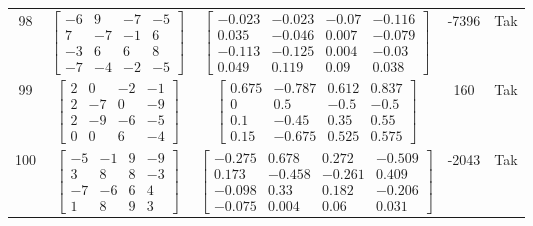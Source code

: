 \documentclass[a4paper,12pt]{article}
\begin{document}
\begin{tabular}{c c c c c}
98
&
$\begin{bmatrix} -6 & 9 & -7 & -5 \\ 7 & -7 & -1 & 6 \\ -3 & 6 & 6 & 8 \\ -7 & -4 & -2 & -5 \end{bmatrix}$
&
$\begin{bmatrix} -0.023 & -0.023 & -0.07 & -0.116 \\ 0.035 & -0.046 & 0.007 & -0.079 \\ -0.113 & -0.125 & 0.004 & -0.03 \\ 0.049 & 0.119 & 0.09 & 0.038 \end{bmatrix}$
&
-7396
&
Tak
\\
99
&
$\begin{bmatrix} 2 & 0 & -2 & -1 \\ 2 & -7 & 0 & -9 \\ 2 & -9 & -6 & -5 \\ 0 & 0 & 6 & -4 \end{bmatrix}$
&
$\begin{bmatrix} 0.675 & -0.787 & 0.612 & 0.837 \\ 0 & 0.5 & -0.5 & -0.5 \\ 0.1 & -0.45 & 0.35 & 0.55 \\ 0.15 & -0.675 & 0.525 & 0.575 \end{bmatrix}$
&
160
&
Tak
\\
100
&
$\begin{bmatrix} -5 & -1 & 9 & -9 \\ 3 & 8 & 8 & -3 \\ -7 & -6 & 6 & 4 \\ 1 & 8 & 9 & 3 \end{bmatrix}$
&
$\begin{bmatrix} -0.275 & 0.678 & 0.272 & -0.509 \\ 0.173 & -0.458 & -0.261 & 0.409 \\ -0.098 & 0.33 & 0.182 & -0.206 \\ -0.075 & 0.004 & 0.06 & 0.031 \end{bmatrix}$
&
-2043
&
Tak
\\
\end{tabular} \egroup \newpage
\end{document}
